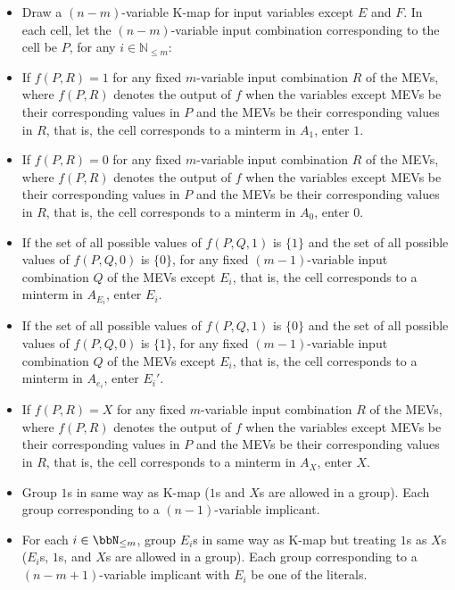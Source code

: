 \documentclass[a4paper,12pt]{article}
\begin{document}
\begin{itemize}
\begin{itemize}
\begin{itemize}
\begin{itemize}
\begin{itemize}
\begin{itemize}
\begin{itemize}
\begin{itemize}
\begin{itemize}
\[f=\sum m(i\mid m_i\in A_1)+\sum_{i=1}^mE_i\sum m(i\mid m_i\in A_{E_i})+\sum_{i=1}^mE_i'\sum m(i\mid m_i\in A_{e_i})+\sum d(i\mid m_i\in A_X),\]
where $m_i$ is minterms in $(n-m)$-variable truth tables. Let $A$ be the set of all $(n-m)$-variable input combinations, and
\[A_0=A\setminus\qty(A_1\cap A_X\cap\bigcap_{i=1}^m\qty(A_{E_i}\cap A_{e_i})).\]
\ben
\item Draw a $(n-m)$-variable K-map for input variables except $E$ and $F$. In each cell, let the $(n-m)$-variable input combination corresponding to the cell be $P$, for any $i\in\mathbb{N}_{\leq m}$:
\bit
\item If $f(P,R)=1$ for any fixed $m$-variable input combination $R$ of the MEVs, where $f(P,R)$ denotes the output of $f$ when the variables except MEVs be their corresponding values in $P$ and the MEVs be their corresponding values in $R$, that is, the cell corresponds to a minterm in $A_1$, enter $1$.
\item If $f(P,R)=0$ for any fixed $m$-variable input combination $R$ of the MEVs, where $f(P,R)$ denotes the output of $f$ when the variables except MEVs be their corresponding values in $P$ and the MEVs be their corresponding values in $R$, that is, the cell corresponds to a minterm in $A_0$, enter $0$.
\item If the set of all possible values of $f(P,Q,1)$ is $\{1\}$ and the set of all possible values of $f(P,Q,0)$ is $\{0\}$, for any fixed $(m-1)$-variable input combination $Q$ of the MEVs except $E_i$, that is, the cell corresponds to a minterm in $A_{E_i}$, enter $E_i$.
\item If the set of all possible values of $f(P,Q,1)$ is $\{0\}$ and the set of all possible values of $f(P,Q,0)$ is $\{1\}$, for any fixed $(m-1)$-variable input combination $Q$ of the MEVs except $E_i$, that is, the cell corresponds to a minterm in $A_{e_i}$, enter $E_i'$.
\item If $f(P,R)=X$ for any fixed $m$-variable input combination $R$ of the MEVs, where $f(P,R)$ denotes the output of $f$ when the variables except MEVs be their corresponding values in $P$ and the MEVs be their corresponding values in $R$, that is, the cell corresponds to a minterm in $A_X$, enter $X$.
\eit
\item Group $1$s in same way as K-map ($1$s and $X$s are allowed in a group). Each group corresponding to a $(n-1)$-variable implicant.
\item For each $i\in\bbN_{\leq m}$, group $E_i$s in same way as K-map but treating $1$s as $X$s ($E_i$s, $1$s, and $X$s are allowed in a group). Each group corresponding to a $(n-m+1)$-variable implicant with $E_i$ be one of the literals.

\end{itemize}
\end{itemize}
\end{itemize}
\end{itemize}
\end{itemize}
\end{itemize}
\end{itemize}
\end{itemize}
\end{itemize}
\end{document}
